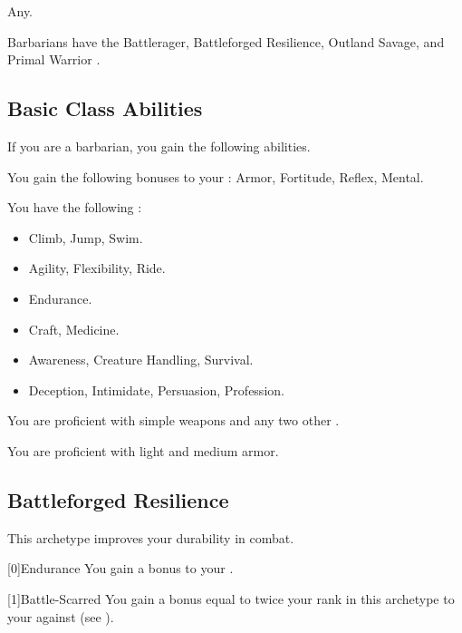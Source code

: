      Any.

     Barbarians have the Battlerager, Battleforged Resilience, Outland Savage, and Primal Warrior .

    \subsection{Basic Class Abilities}
        If you are a barbarian, you gain the following abilities.

        You gain the following bonuses to your :  Armor,  Fortitude,  Reflex,  Mental.

        You have the following :
        \begin{itemize}
            \item {} Climb, Jump, Swim.
            \item {} Agility, Flexibility, Ride.
            \item {} Endurance.
            \item {} Craft, Medicine.
            \item {} Awareness, Creature Handling, Survival.
            \item {} Deception, Intimidate, Persuasion, Profession.
        \end{itemize}

        You are proficient with simple weapons and any two other .

        You are proficient with light and medium armor.

    \newpage
    \subsection{Battleforged Resilience}
        This archetype improves your durability in combat.

        [0]{Endurance} You gain a  bonus to your .

        [1]{Battle-Scarred} You gain a bonus equal to twice your rank in this archetype to your  against  (see ).

